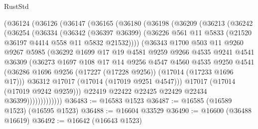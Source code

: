 \begin{lexlean}{RustStd}
\begin{coremodule}
{\begin{coremodule}
{{{{{{{{{{{{{{{{{{{{{{{{{{{{{{{{{{{{{{{{{{{{{{{{{{{{{{{        (@36124
          (@36126
            (@36147
              (@36165
                (@36180
                  (@36198
                    (@36209
                      (@36213
                        (@36242
                          (@36254
                            (@36334
                              (@36342
                                (@36397 @36399)
                                (@36226
                                  @561
                                  @11
                                  @5833
                                  (@21520 @36197 @4414 @558 @11 @5832 @21532))))
                            (@36343
                              @1700
                              @503
                              @11
                              @9260
                              @9267
                              @5985
                              (@36292
                                @1699
                                @17
                                @19
                                @4581
                                @9259
                                @9266
                                @4535
                                @9241
                                @4541
                                @36309
                                (@36273
                                  @1697
                                  @108
                                  @17
                                  @14
                                  @9256
                                  @4547
                                  @4560
                                  @4535
                                  @9250
                                  @4541
                                  (@36286
                                    @1696
                                    @9256
                                    (@17227 (@17228 @9256))
                                    (@17014 (@17233 @1696 @17)))
                                  @36312
                                  @17017
                                  (@17014 (@17019 @9251 @4547)))
                                @17017
                                (@17014 (@17019 @9242 @9259)))
                              @22419
                              @22422
                              @22425
                              @22429
                              @22434
                              @36399)))))))))))))
@36483 := @16583 @1523
@36487 := @16585 (@16589 @1523) (@16595 @1523)
@36488 := @16604 @33529
@36490 := @16600 (@36488 @16619)
@36492 := @16642 (@16643 @1523)
}}}}}}}}}}}}}}}}}}}}}}}}}}}}}}}}}}}}}}}}}}}}}}}}}}}}}}}
\end{coremodule}}
\end{coremodule}
\end{lexlean}
